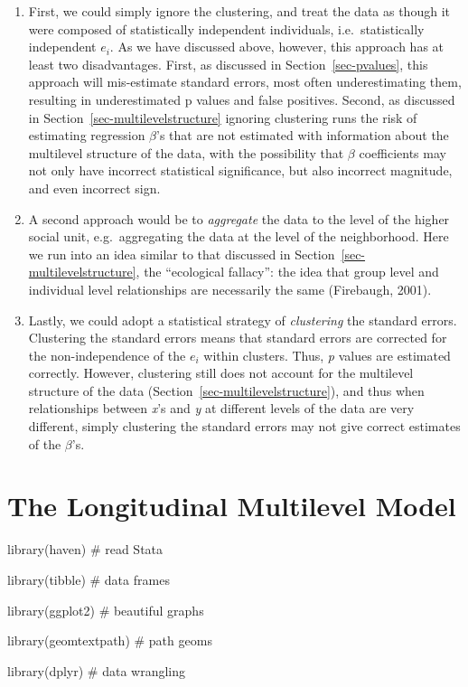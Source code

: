 \documentclass[
  letterpaper,
  DIV=11,
  numbers=noendperiod]{scrreprt}
\newenvironment{Shaded}{\begin{snugshade}}{\end{snugshade}}
\newcommand{\CommentTok}[1]{\textcolor[rgb]{0.37,0.37,0.37}{#1}}
\newcommand{\FunctionTok}[1]{\textcolor[rgb]{0.28,0.35,0.67}{#1}}
\newcommand{\NormalTok}[1]{\textcolor[rgb]{0.00,0.23,0.31}{#1}}
\providecommand{\tightlist}{%
  \setlength{\itemsep}{0pt}\setlength{\parskip}{0pt}}\usepackage{longtable,booktabs,array}
\begin{document}
\begin{enumerate}
\def\labelenumi{\arabic{enumi}.}
\tightlist
\item
  First, we could simply ignore the clustering, and treat the data as
  though it were composed of statistically independent individuals,
  i.e.~statistically independent \(e_i\). As we have discussed above,
  however, this approach has at least two disadvantages. First, as
  discussed in Section~\ref{sec-pvalues}, this approach will
  mis-estimate standard errors, most often underestimating them,
  resulting in underestimated p values and false positives. Second, as
  discussed in Section~\ref{sec-multilevelstructure} ignoring clustering
  runs the risk of estimating regression \(\beta\)'s that are not
  estimated with information about the multilevel structure of the data,
  with the possibility that \(\beta\) coefficients may not only have
  incorrect statistical significance, but also incorrect magnitude, and
  even incorrect sign.
\item
  A second approach would be to \emph{aggregate} the data to the level
  of the higher social unit, e.g.~aggregating the data at the level of
  the neighborhood. Here we run into an idea similar to that discussed
  in Section~\ref{sec-multilevelstructure}, the ``ecological fallacy'':
  the idea that group level and individual level relationships are
  necessarily the same (Firebaugh, 2001).
\item
  Lastly, we could adopt a statistical strategy of \emph{clustering} the
  standard errors. Clustering the standard errors means that standard
  errors are corrected for the non-independence of the \(e_i\) within
  clusters. Thus, \emph{p} values are estimated correctly. However,
  clustering still does not account for the multilevel structure of the
  data (Section~\ref{sec-multilevelstructure}), and thus when
  relationships between \emph{x}'s and \emph{y} at different levels of
  the data are very different, simply clustering the standard errors may
  not give correct estimates of the \(\beta\)'s.
\end{enumerate}


\hypertarget{the-longitudinal-multilevel-model}{%
\chapter{The Longitudinal Multilevel
Model}\label{the-longitudinal-multilevel-model}}

\begin{Shaded}
\begin{Highlighting}[]
\FunctionTok{library}\NormalTok{(haven) }\CommentTok{\# read Stata}

\FunctionTok{library}\NormalTok{(tibble) }\CommentTok{\# data frames}

\FunctionTok{library}\NormalTok{(ggplot2) }\CommentTok{\# beautiful graphs}

\FunctionTok{library}\NormalTok{(geomtextpath) }\CommentTok{\# path geoms}

\FunctionTok{library}\NormalTok{(dplyr) }\CommentTok{\# data wrangling}
\end{Highlighting}
\end{Shaded}
\end{document}
